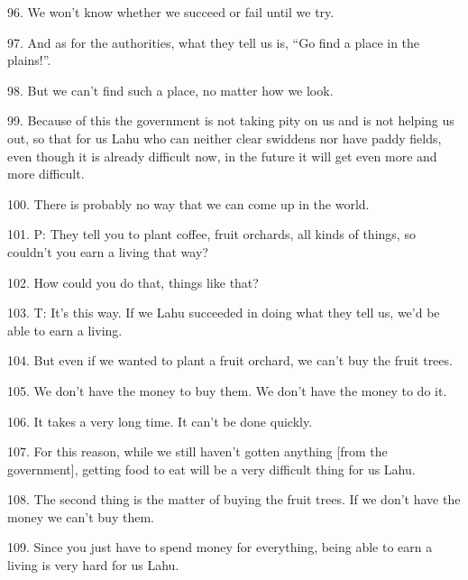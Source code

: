96. We won't know whether we succeed or fail until we try.

97. And as for the authorities, what they tell us is, ``Go find a place in the plains!''.

98. But we can't find such a place, no matter how we look.

99. Because of this the government is not taking pity on us and is not helping us
out, so that for us Lahu who can neither clear swiddens nor have paddy fields,
even though it is already difficult now, in the future it will get even more and
more difficult.

100. There is probably no way that we can come up in the world.

101. P: They tell you to plant coffee, fruit orchards, all kinds of things, so
couldn't you earn a living that way?

102. How could you do that, things like that?

103. T: It's this way. If we Lahu succeeded in doing what they tell us, we'd
be able to earn a living.

104. But even if we wanted to plant a fruit orchard, we can't buy the fruit trees.

105. We don't have the money to buy them. We don't have the money to do it.

106. It takes a very long time. It can't be done quickly.

107. For this reason, while we still haven't gotten anything [from the government],
getting food to eat will be a very difficult thing for us Lahu.

108. The second thing is the matter of buying the fruit trees. If we don't have
the money we can't buy them.

109. Since you just have to spend money for everything, being able to earn a living
is very hard for us Lahu.

